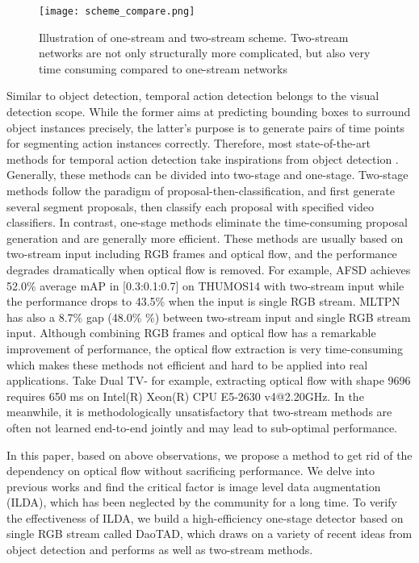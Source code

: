 \documentclass[final]{cvpr}
\begin{document}
\begin{figure}[htp]
    \centering
    \texttt{[image: scheme\_compare.png]}
    \caption{Illustration of one-stream and two-stream scheme. Two-stream networks are not only structurally more complicated, but also very time consuming compared to one-stream networks}
    \label{scheme compare}
\end{figure}

Similar to object detection, temporal action detection belongs to the visual detection scope. While the former aims at predicting bounding boxes to surround object instances precisely, the latter's purpose is to generate pairs of time points for segmenting action instances correctly. Therefore, most state-of-the-art methods \cite{xu2017r, lin2017single, zhang2018s3d, chao2018rethinking, wang2020multi, liu2020progressive, lin2021learning} for temporal action detection take inspirations from object detection \cite{liu2016ssd, cai2018cascade, tian2019fcos}. Generally, these methods can be divided into two-stage and one-stage. Two-stage methods \cite{xu2017r, chao2018rethinking, lin2021learning} follow the paradigm of proposal-then-classification, and first generate several segment proposals, then classify each proposal with specified video classifiers. In contrast, one-stage methods \cite{lin2017single, zhang2018s3d, liu2020progressive, wang2020multi} eliminate the time-consuming proposal generation and are generally more efficient. These methods are usually based on two-stream input including RGB frames and optical flow, and the performance degrades dramatically when optical flow is removed. For example, AFSD \cite{lin2021learning} achieves 52.0\% average mAP in [0.3:0.1:0.7] on THUMOS14 \cite{jiang2014thumos} with two-stream input while the performance drops to 43.5\% when the input is single RGB stream. MLTPN \cite{wang2020multi} has also a 8.7\% gap (48.0\% \%) between two-stream input and single RGB stream input. Although combining RGB frames and optical flow has a remarkable improvement of performance, the optical flow extraction is very time-consuming which makes these methods not efficient and hard to be applied into real applications. Take Dual TV- \cite{zach2007duality} for example, extracting optical flow with shape 9696 requires 650 ms on Intel(R) Xeon(R) CPU E5-2630 v4@2.20GHz. In the meanwhile, it is methodologically unsatisfactory that two-stream methods are often not learned end-to-end jointly and may lead to sub-optimal performance.

In this paper, based on above observations, we propose a method to get rid of the dependency on optical flow without sacrificing performance. We delve into previous works and find the critical factor is image level data augmentation (ILDA), which has been neglected by the community for a long time. To verify the effectiveness of ILDA, we build a high-efficiency one-stage detector based on single RGB stream called DaoTAD, which draws on a variety of recent ideas from object detection and performs as well as two-stream methods.
\end{document}
